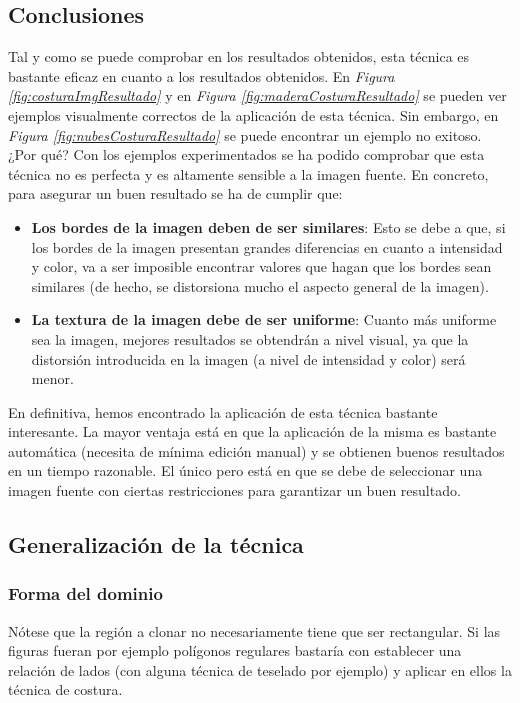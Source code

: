 \documentclass[11pt,twoside,titlepage,a4paper]{article}
\numberwithin{equation}{section} %
\theoremstyle{usual}
\begin{document}
\subsection{Conclusiones}

Tal y como se puede comprobar en los resultados obtenidos, esta técnica es bastante eficaz en cuanto a los resultados obtenidos. En \textit{Figura \ref{fig:costuraImgResultado}} y en \textit{Figura \ref{fig:maderaCosturaResultado}} se pueden ver ejemplos visualmente correctos de la aplicación de esta técnica. Sin embargo, en \textit{Figura \ref{fig:nubesCosturaResultado}} se puede encontrar un ejemplo no exitoso. ¿Por qué? Con los ejemplos experimentados se ha podido comprobar que esta técnica no es perfecta y es altamente sensible a la imagen fuente. En concreto, para asegurar un buen resultado se ha de cumplir que:

\begin{itemize}
    \item \textbf{Los bordes de la imagen deben de ser similares}: Esto se debe a que, si los bordes de la imagen presentan grandes diferencias en cuanto a intensidad y color, va a ser imposible encontrar valores que hagan que los bordes sean similares (de hecho, se distorsiona mucho el aspecto general de la imagen).
    \item \textbf{La textura de la imagen debe de ser uniforme}: Cuanto más uniforme sea la imagen, mejores resultados se obtendrán a nivel visual, ya que la distorsión introducida en la imagen (a nivel de intensidad y color) será menor.
\end{itemize}

En definitiva, hemos encontrado la aplicación de esta técnica bastante interesante. La mayor ventaja está en que la aplicación de la misma es bastante automática (necesita de mínima edición manual) y se obtienen buenos resultados en un tiempo razonable. El único pero está en que se debe de seleccionar una imagen fuente con ciertas restricciones para garantizar un buen resultado.

\subsection{Generalización de la técnica}

\subsubsection{Forma del dominio}

Nótese que la región a clonar no necesariamente tiene que ser rectangular.  Si las figuras fueran por ejemplo polígonos regulares bastaría con establecer una relación de lados (con alguna técnica de teselado por ejemplo) y aplicar en ellos la técnica de costura.
\end{document}
